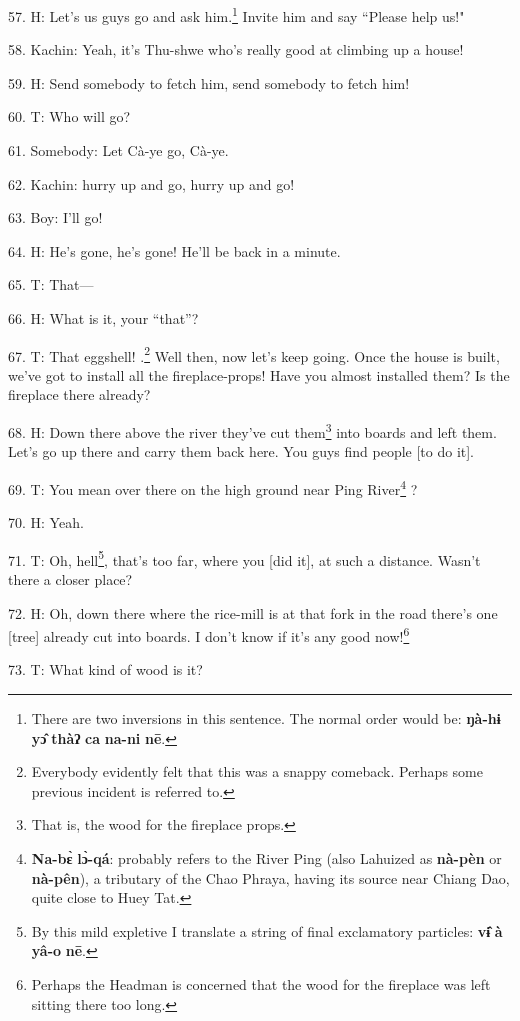 57. H: Let's us guys go and ask him.\footnote{There are two inversions in this sentence. The normal order would be: \textbf{ŋà-hɨ} \textbf{yɔ̂} \textbf{thàʔ} \textbf{ca} \textbf{na-ni} \textbf{nē}.} Invite him and say ``Please
help us!"

58. Kachin: Yeah, it's Thu-shwe who's really good at climbing up a house!

59. H: Send somebody to fetch him, send somebody to fetch him!

60. T: Who will go?

61. Somebody: Let Cà-ye go, Cà-ye.

62. Kachin: hurry up and go, hurry up and go!

63. Boy: I'll go!

64. H: He's gone, he's gone! He'll be back in a minute.

65. T: That---

66. H: What is it, your ``that''?

67. T: That eggshell! .\footnote{Everybody evidently felt that this was a snappy comeback. Perhaps some previous incident is referred to.} Well then, now let's keep
going. Once the house is built, we've got to install all the fireplace-props!
Have you almost installed them? Is the fireplace there already?

68. H: Down there above the river they've cut them\footnote{That is, the wood for the fireplace props.} into boards and left them.
Let's go up there and carry them back here. You guys find people [to do it].

69. T: You mean over there on the high ground near Ping River\footnote{\textbf{Na-bɛ̀} \textbf{lɔ̀-qá}: probably refers to the River Ping (also Lahuized as \textbf{nà-pèn} or \textbf{nà-pên}), a tributary of the Chao Phraya, having its source near Chiang Dao, quite close to Huey Tat.} ?

70. H: Yeah.

71. T: Oh, hell\footnote{By this mild expletive I translate a string of final exclamatory particles: \textbf{vɨ̂} \textbf{à} \textbf{yâ-o} \textbf{nē}.}, that's too far, where you [did it], at such a distance. Wasn't
there a closer place?

72. H: Oh, down there where the rice-mill is at that fork in the road there's one
[tree] already cut into boards. I don't know if it's any good now!\footnote{Perhaps the Headman is concerned that the wood for the fireplace was left sitting there too long.}

73. T: What kind of wood is it?

